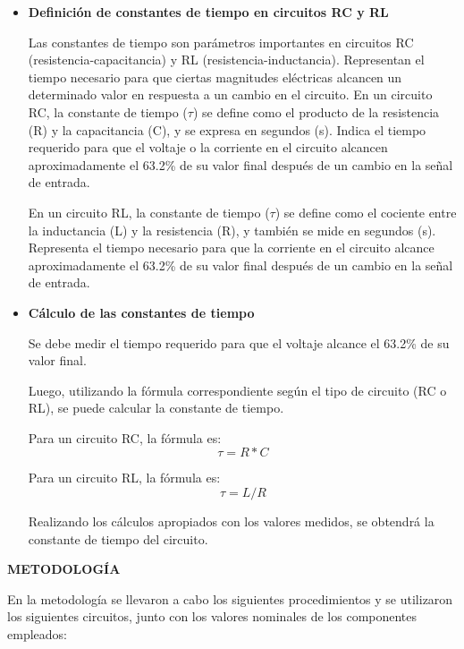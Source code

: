 \documentclass[12pt]{article}
\begin{document}
	\begin{itemize}
		\item \textbf{Definición de constantes de tiempo en circuitos RC y RL}
		
		Las constantes de tiempo son parámetros importantes en circuitos RC (resistencia-capacitancia) y RL (resistencia-inductancia). Representan el tiempo necesario para que ciertas magnitudes eléctricas alcancen un determinado valor en respuesta a un cambio en el circuito.
		En un circuito RC, la constante de tiempo ($\tau$) se define como el producto de la resistencia (R) y la capacitancia (C), y se expresa en segundos (s). Indica el tiempo requerido para que el voltaje o la corriente en el circuito alcancen aproximadamente el 63.2\% de su valor final después de un cambio en la señal de entrada.
		
		En un circuito RL, la constante de tiempo ($\tau$) se define como el cociente entre la inductancia (L) y la resistencia (R), y también se mide en segundos (s). Representa el tiempo necesario para que la corriente en el circuito alcance aproximadamente el 63.2\% de su valor final después de un cambio en la señal de entrada.
		
		\item \textbf{Cálculo de las constantes de tiempo}
		
		Se debe medir el tiempo requerido para que el voltaje alcance el 63.2\% de su valor final.
		
		Luego, utilizando la fórmula correspondiente según el tipo de circuito (RC o RL), se puede calcular la constante de tiempo.
		
		Para un circuito RC, la fórmula es: $$\tau = R * C$$
		
		Para un circuito RL, la fórmula es: $$\tau = L / R$$
		
		Realizando los cálculos apropiados con los valores medidos, se obtendrá la constante de tiempo del circuito.
	\end{itemize}
	
	\newpage
	
	\begin{center}
		\textbf{\large METODOLOGÍA}\\
	\end{center}
	
	En la metodología se llevaron a cabo los siguientes procedimientos y se utilizaron los siguientes circuitos, junto con los valores nominales de los componentes empleados:\\
	
\end{document}
